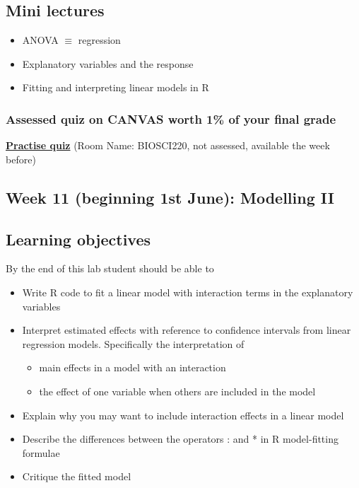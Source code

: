 \documentclass{article}
\begin{document}
\subsection*{Mini lectures}

\begin{itemize}
\item ANOVA $\equiv$ regression
\item Explanatory variables and the response
\item Fitting and interpreting linear models in R
\end{itemize}


\subsubsection*{Assessed quiz on CANVAS worth 1\% of your final grade}

\begin{center}
  \href{https://b.socrative.com/login/student/}{\textbf{\Large Practise quiz}} (Room Name: BIOSCI220, not assessed, available the week before)
  
\end{center}


\newpage

\subsection*{Week 11 (beginning 1st June): Modelling II}
\subsection*{Learning objectives}
By the end of this lab student should be able to
\begin{itemize}
\item Write R code to fit a linear model with interaction terms in the explanatory variables
\item Interpret estimated effects with reference to confidence intervals from linear regression models. Specifically the interpretation of
  \begin{itemize}
  \item main effects in a model with an interaction
  \item the effect of one variable when others are included in the model
  \end{itemize}
\item Explain why you may want to include interaction effects in a linear model
\item Describe the differences between the operators : and * in R model-fitting formulae
\item Critique the fitted model
\end{itemize}
\end{document}
